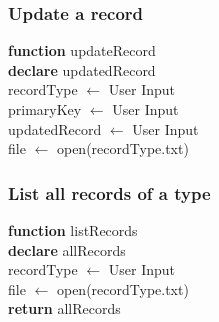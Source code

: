 \documentclass[12pt,a4paper]{article}
\begin{document}
            \subsubsection{Update a record}
            \IncMargin{1em}
                \begin{algorithm}[H]
                    \SetAlgoLined
                    \textbf{function} updateRecord \\
                    \textbf{declare} updatedRecord \\
                    recordType $\leftarrow$ User Input \\
                    primaryKey $\leftarrow$ User Input \\
                    updatedRecord $\leftarrow$ User Input \\
                    file $\leftarrow$ open(recordType.txt) \\
                    
                     
                \end{algorithm}
            \DecMargin{1em}
        \subsubsection{List all records of a type}
            \IncMargin{1em}
                \begin{algorithm}[H]
                    \SetAlgoLined
                    \textbf{function} listRecords \\
                    \textbf{declare} allRecords \\
                    recordType $\leftarrow$ User Input \\
                    file $\leftarrow$ open(recordType.txt) \\
                    \textbf{return} allRecords
                     
                \end{algorithm}
            \DecMargin{1em}
            
\end{document}
